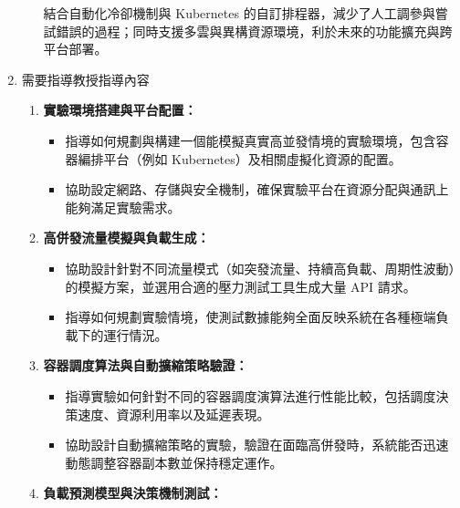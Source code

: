 \documentclass[12pt,a4paper]{article}
\begin{document}
\begin{enumerate}[label={(\zhdig*)}, leftmargin=2\parindent, listparindent=\parindent]
\begin{enumerate}[label={(\arabic*)}, leftmargin=\parindent, listparindent=\parindent]
結合自動化冷卻機制與 Kubernetes 的自訂排程器，減少了人工調參與嘗試錯誤的過程；同時支援多雲與異構資源環境，利於未來的功能擴充與跨平台部署。
\end{enumerate}

\item 需要指導教授指導內容

\begin{enumerate}[label={(\arabic*)}, leftmargin=\parindent, listparindent=\parindent]

	\item \textbf{實驗環境搭建與平台配置：}\textbf{}
\begin{itemize}[leftmargin=\parindent, listparindent=\parindent]

    \item 指導如何規劃與構建一個能模擬真實高並發情境的實驗環境，包含容器編排平台（例如 Kubernetes）及相關虛擬化資源的配置。


    \item 協助設定網路、存儲與安全機制，確保實驗平台在資源分配與通訊上能夠滿足實驗需求。

\end{itemize}
\item \textbf{高併發流量模擬與負載生成：}\textbf{}

    \begin{itemize}[leftmargin=\parindent, listparindent=\parindent]
        \item 協助設計針對不同流量模式（如突發流量、持續高負載、周期性波動）的模擬方案，並選用合適的壓力測試工具生成大量 API 請求。


        \item 指導如何規劃實驗情境，使測試數據能夠全面反映系統在各種極端負載下的運行情況。

    \end{itemize}
\item \textbf{容器調度算法與自動擴縮策略驗證：}\textbf{}

    \begin{itemize}[leftmargin=\parindent, listparindent=\parindent]
        \item 指導實驗如何針對不同的容器調度演算法進行性能比較，包括調度決策速度、資源利用率以及延遲表現。


        \item 協助設計自動擴縮策略的實驗，驗證在面臨高併發時，系統能否迅速動態調整容器副本數並保持穩定運作。
    \end{itemize}

\item \textbf{負載預測模型與決策機制測試：}\textbf{}


\end{enumerate}
\end{enumerate}
\end{document}
